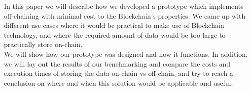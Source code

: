 In this paper we will describe how we developed a prototype which implements off-chaining with minimal cost to the Blockchain’s properties. We came up with different use cases where it would be practical to make use of Blockchain technology, and where the required amount of data would be too large to practically store on-chain.\\
We will show how our prototype was designed and how it functions. In addition, we will lay out the results of our benchmarking and compare the costs and execution times of storing the data on-chain vs off-chain, and try to reach a conclusion on where and when this solution would be applicable and useful. 


\newpage\newpage
